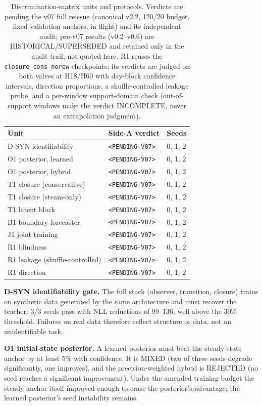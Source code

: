 \documentclass{article}
\begin{document}
\begin{table}[t]
\centering
\small
\begin{tabular}{lll}
\toprule
Unit & Side-A verdict & Seeds \\
\midrule
D-SYN identifiability & \texttt{<PENDING-V07>} & 0, 1, 2 \\
O1 posterior, learned & \texttt{<PENDING-V07>} & 0, 1, 2 \\
O1 posterior, hybrid & \texttt{<PENDING-V07>} & 0, 1, 2 \\
T1 closure (conservative) & \texttt{<PENDING-V07>} & 0, 1, 2 \\
T1 closure (steam-only) & \texttt{<PENDING-V07>} & 0, 1, 2 \\
T1 latent block & \texttt{<PENDING-V07>} & 0, 1, 2 \\
B1 boundary forecaster & \texttt{<PENDING-V07>} & 0, 1, 2 \\
J1 joint training & \texttt{<PENDING-V07>} & 0, 1, 2 \\
R1 blindness & \texttt{<PENDING-V07>} & 0, 1, 2 \\
R1 leakage (shuffle-controlled) & \texttt{<PENDING-V07>} & 0, 1, 2 \\
R1 direction & \texttt{<PENDING-V07>} & 0, 1, 2 \\
\bottomrule
\end{tabular}
\caption{Discrimination-matrix units and protocols. Verdicts are pending the v07
full reissue (canonical v2.2, 120/20 budget, fixed validation anchors; in flight)
and its independent audit; pre-v07 results (v0.2--v0.6) are HISTORICAL/SUPERSEDED
and retained only in the audit trail, not quoted here. R1 reuses the
\texttt{closure\_cons\_norew} checkpoints; its verdicts are judged on both valves at
H18/H60 with day-block confidence intervals, direction proportions, a
shuffle-controlled leakage probe, and a per-window support-domain check
(out-of-support windows make the verdict INCOMPLETE, never an extrapolation
judgment).}
\label{tab:verdicts}
\end{table}

\textbf{D-SYN identifiability gate.} The full stack (observer, transition, closure)
trains on synthetic data generated by the same architecture and must recover the
teacher: 3/3 seeds pass with NLL reductions of 99--136, well above the 30\% threshold.
Failures on real data therefore reflect structure or data, not an unidentifiable task.

\textbf{O1 initial-state posterior.} A learned posterior must beat the steady-state
anchor by at least 5\% with confidence. It is MIXED (two of three seeds degrade
significantly, one improves), and the precision-weighted hybrid is REJECTED (no seed
reaches a significant improvement). Under the amended training budget the steady
anchor itself improved enough to erase the posterior's advantage; the learned
posterior's seed instability remains.
\end{document}
